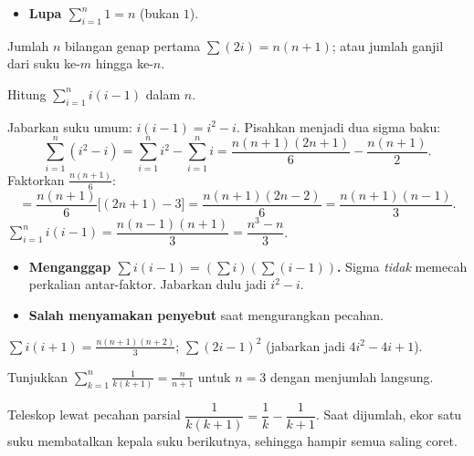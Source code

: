 \begin{jebakan}
\begin{itemize}[leftmargin=*,topsep=2pt]
  \item \textbf{Lupa $\sum_{i=1}^{n}1=n$} (bukan $1$).
\end{itemize}
\end{jebakan}

\begin{variasi}
Jumlah $n$ bilangan genap pertama $\sum(2i)=n(n+1)$; atau jumlah ganjil dari
suku ke-$m$ hingga ke-$n$.
\end{variasi}

\begin{soalbox}{}
Hitung $\displaystyle\sum_{i=1}^{n} i(i-1)$ dalam $n$.
\end{soalbox}

\jawab
{} Jabarkan suku umum: $i(i-1)=i^2-i$.
 Pisahkan menjadi dua sigma baku:
\[
\sum_{i=1}^{n}(i^2-i)=\sum_{i=1}^{n}i^2-\sum_{i=1}^{n}i
=\frac{n(n+1)(2n+1)}{6}-\frac{n(n+1)}{2}.
\]
 Faktorkan $\frac{n(n+1)}{6}$:
\[
=\frac{n(n+1)}{6}\big[(2n+1)-3\big]=\frac{n(n+1)(2n-2)}{6}=\frac{n(n+1)(n-1)}{3}.
\]
\jadi $\displaystyle\sum_{i=1}^{n}i(i-1)=\dfrac{n(n-1)(n+1)}{3}=\dfrac{n^3-n}{3}$.

\begin{jebakan}
\begin{itemize}[leftmargin=*,topsep=2pt]
  \item \textbf{Menganggap $\sum i(i-1)=(\sum i)(\sum(i-1))$.} Sigma \emph{tidak}
  memecah perkalian antar-faktor. Jabarkan dulu jadi $i^2-i$.
  \item \textbf{Salah menyamakan penyebut} saat mengurangkan pecahan.
\end{itemize}
\end{jebakan}

\begin{variasi}
$\sum i(i+1)=\frac{n(n+1)(n+2)}{3}$; $\sum(2i-1)^2$ (jabarkan jadi
$4i^2-4i+1$).
\end{variasi}

\begin{soalbox}{}
Tunjukkan $\displaystyle\sum_{k=1}^{n}\frac{1}{k(k+1)}=\frac{n}{n+1}$ untuk $n=3$
dengan menjumlah langsung.
\end{soalbox}

\begin{ingat}{Teleskop lewat pecahan parsial}
$\dfrac{1}{k(k+1)}=\dfrac1k-\dfrac{1}{k+1}$. Saat dijumlah, ekor satu suku
membatalkan kepala suku berikutnya, sehingga hampir semua saling coret.
\end{ingat}

